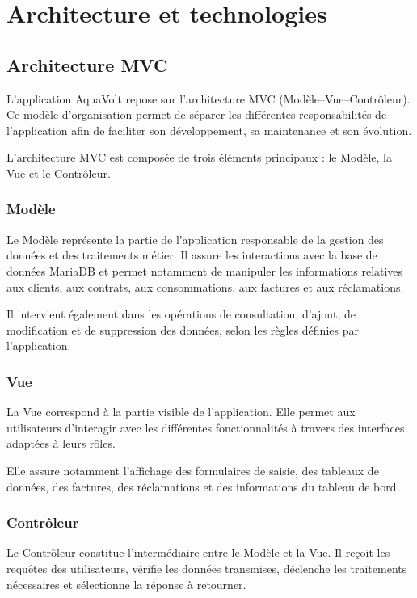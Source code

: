 
\chapter{Architecture et technologies}
\label{chap:architecture}

\section{Architecture MVC}

L'application AquaVolt repose sur l'architecture MVC (Modèle--Vue--Contrôleur). Ce modèle d'organisation permet de séparer les différentes responsabilités de l'application afin de faciliter son développement, sa maintenance et son évolution.

L'architecture MVC est composée de trois éléments principaux : le Modèle, la Vue et le Contrôleur.

\subsection{Modèle}

Le Modèle représente la partie de l'application responsable de la gestion des données et des traitements métier. Il assure les interactions avec la base de données MariaDB et permet notamment de manipuler les informations relatives aux clients, aux contrats, aux consommations, aux factures et aux réclamations.

Il intervient également dans les opérations de consultation, d'ajout, de modification et de suppression des données, selon les règles définies par l'application.

\subsection{Vue}

La Vue correspond à la partie visible de l'application. Elle permet aux utilisateurs d'interagir avec les différentes fonctionnalités à travers des interfaces adaptées à leurs rôles.

Elle assure notamment l'affichage des formulaires de saisie, des tableaux de données, des factures, des réclamations et des informations du tableau de bord.

\subsection{Contrôleur}

Le Contrôleur constitue l'intermédiaire entre le Modèle et la Vue. Il reçoit les requêtes des utilisateurs, vérifie les données transmises, déclenche les traitements nécessaires et sélectionne la réponse à retourner.

